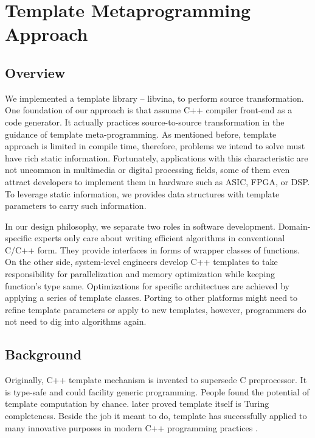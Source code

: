 \documentclass[10pt, conference, compsocconf]{IEEEtran}
\begin{document}
\section{Template Metaprogramming Approach}
\subsection{Overview}
We implemented a template library -- libvina, to perform source
transformation. One foundation of our approach is that assume C++
compiler front-end as a code generator. It actually practices
source-to-source transformation in the guidance of template
meta-programming. As mentioned before, template approach is limited in
compile time, therefore, problems we intend to solve must have rich static
information. Fortunately,  applications with this characteristic are
not uncommon in multimedia or digital processing fields, some of them 
even attract developers to implement them in hardware such as ASIC,
FPGA, or DSP. To leverage
static information, we provides data structures with
template parameters to carry such information. 


In our design philosophy, we separate two roles in software
development. Domain-specific experts only care about writing efficient
algorithms in conventional C/C++ form. They provide interfaces in
forms of wrapper classes of functions. On the other side, system-level engineers develop C++ templates to take responsibility for
parallelization and memory optimization while keeping function's
type same. Optimizations for specific architectues are
achieved by applying a series of template classes. Porting to other platforms might need to refine
template parameters or apply to new templates, however, programmers do
not need to dig into algorithms again.

\subsection{Background}
Originally, C++ template mechanism is invented to supersede C preprocessor. It is type-safe and could facility generic programming. People found the potential of template computation by chance. \cite{b6} later proved template itself is Turing completeness. Beside the job it meant to do, template has successfully applied to many innovative purposes in modern C++ programming practices \cite{b9}. 
\end{document}
